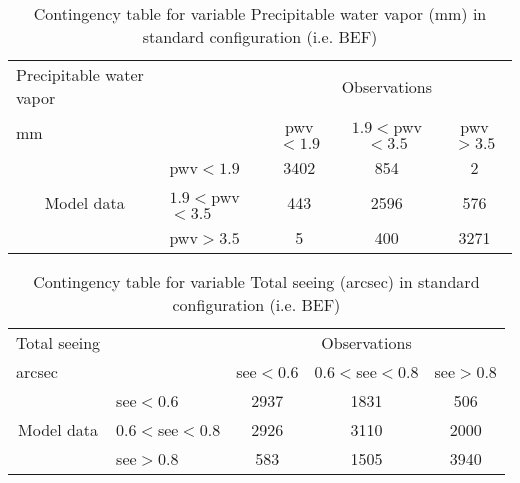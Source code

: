 \documentclass[11pt,english]{article}
\begin{document}
\begin{table}[]
\begin{center}
\begin{tabular}{llccc}
\hline
{Precipitable water vapor}                                       &                                                    & \multicolumn{3}{c}{Observations}                 \\
{mm}                                       &                             & pwv$<1.9$   & $1.9<$pwv$<3.5$ & pwv$>3.5$ \\
\hline
\multicolumn{1}{c}{\multirow{3}{*}{Model data}}  & pwv$<1.9$          & 3402                & 854                       & 2              \\
                                                 & $1.9<$pwv$<3.5$ & 443                & 2596                       & 576              \\
                                                 & pwv$>3.5$          & 5                & 400                       & 3271              \\
\hline
\end{tabular}
\end{center}
\caption{Contingency table for variable Precipitable water vapor (mm) in standard configuration (i.e. BEF)}
\label{tab:contingency}
\end{table}

\begin{table}[]
\begin{center}
\begin{tabular}{llccc}
\hline
{Total seeing}                                       &                                                    & \multicolumn{3}{c}{Observations}                 \\
{arcsec}                                       &                             & see$<0.6$   & $0.6<$see$<0.8$ & see$>0.8$ \\
\hline
\multicolumn{1}{c}{\multirow{3}{*}{Model data}}  & see$<0.6$          & 2937                & 1831                       & 506              \\
                                                 & $0.6<$see$<0.8$ & 2926                & 3110                       & 2000              \\
                                                 & see$>0.8$          & 583                & 1505                       & 3940              \\
\hline
\end{tabular}
\end{center}
\caption{Contingency table for variable Total seeing (arcsec) in standard configuration (i.e. BEF)}
\label{tab:contingency}
\end{table}
\end{document}
